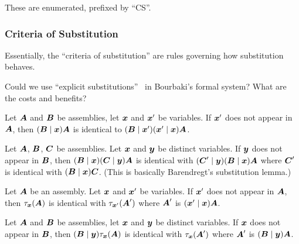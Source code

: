 These are enumerated, prefixed by ``CS''.

\subsubsection{Criteria of Substitution}
Essentially, the ``criteria of substitution'' are rules governing how
substitution behaves.

\begin{puzzle}
Could we use ``explicit substitutions''~\cite{abadi1991explicit} in
Bourbaki's formal system? What are the costs and benefits?
\end{puzzle}

\begin{cs}\label{cs1}
Let $\boldsymbol{A}$ and $\boldsymbol{B}$ be assemblies, let
$\boldsymbol{x}$ and $\boldsymbol{x}'$ be variables. If
$\boldsymbol{x}'$ does not appear in $\boldsymbol{A}$, then
$(\boldsymbol{B}\mid\boldsymbol{x})\boldsymbol{A}$ is identical to $(\boldsymbol{B}\mid\boldsymbol{x}')(\boldsymbol{x}'\mid\boldsymbol{x})\boldsymbol{A}$.
\end{cs}

\begin{cs}\label{cs2}
Let $\boldsymbol{A}$, $\boldsymbol{B}$, $\boldsymbol{C}$
be assemblies. Let $\boldsymbol{x}$ and $\boldsymbol{y}$ be distinct
variables. If $\boldsymbol{y}$ does not appear in $\boldsymbol{B}$,
then $(\boldsymbol{B}\mid\boldsymbol{x})(\boldsymbol{C}\mid\boldsymbol{y})\boldsymbol{A}$
is identical with $(\boldsymbol{C}'\mid\boldsymbol{y})(\boldsymbol{B}\mid\boldsymbol{x})\boldsymbol{A}$
where $\boldsymbol{C}'$ is identical with $(\boldsymbol{B}\mid\boldsymbol{x})\boldsymbol{C}$.
(This is basically Barendregt's substitution lemma.)
\end{cs}

\begin{cs}\label{cs3}
Let $\boldsymbol{A}$ be an assembly.
Let $\boldsymbol{x}$ and $\boldsymbol{x}'$ be variables. If
$\boldsymbol{x}'$ does not appear in $\boldsymbol{A}$, then
$\tau_{\boldsymbol{x}}(\boldsymbol{A})$ is identical with $\tau_{\boldsymbol{x}'}(\boldsymbol{A}')$
where $\boldsymbol{A}'$ is $(\boldsymbol{x}'\mid\boldsymbol{x})\boldsymbol{A}$.
\end{cs}

\begin{cs}\label{cs4}
Let $\boldsymbol{A}$ and $\boldsymbol{B}$ be assemblies, let
$\boldsymbol{x}$ and $\boldsymbol{y}$ be distinct variables.
If $\boldsymbol{x}$ does not appear in $\boldsymbol{B}$,
then
$(\boldsymbol{B}\mid\boldsymbol{y})\tau_{\boldsymbol{x}}(\boldsymbol{A})$
is identical with $\tau_{\boldsymbol{x}}(\boldsymbol{A}')$ where
$\boldsymbol{A}'$ is $(\boldsymbol{B}\mid\boldsymbol{y})\boldsymbol{A}$.
\end{cs}

